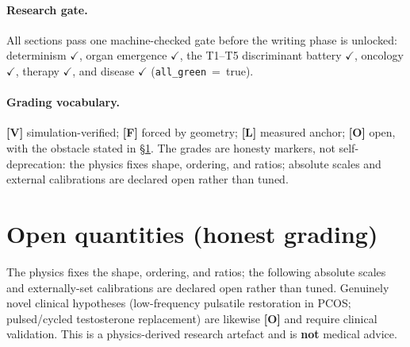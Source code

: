 \documentclass[11pt]{article}
\newcommand{\gradeV}{\textcolor{verified}{\textbf{[V]}}}
\newcommand{\gradeF}{\textcolor{forced}{\textbf{[F]}}}
\newcommand{\gradeL}{\textcolor{verified}{\textbf{[L]}}}
\newcommand{\gradeO}{\textcolor{open}{\textbf{[O]}}}
\begin{document}
\paragraph{Research gate.} All sections pass one machine-checked gate before the writing phase is unlocked:
determinism $\checkmark$, organ
emergence $\checkmark$, the T1--T5 discriminant battery
$\checkmark$, oncology
$\checkmark$, therapy
$\checkmark$, and disease
$\checkmark$ (\texttt{all\_green}~=~true).

\paragraph{Grading vocabulary.} \gradeV{} simulation-verified; \gradeF{} forced by geometry; \gradeL{}
measured anchor; \gradeO{} open, with the obstacle stated in \S\ref{sec:open}. The grades are honesty
markers, not self-deprecation: the physics fixes shape, ordering, and ratios; absolute scales and external
calibrations are declared open rather than tuned.

\section{Open quantities (honest grading)}\label{sec:open}

The physics fixes the shape, ordering, and ratios; the following absolute scales and externally-set
calibrations are declared open rather than tuned. Genuinely novel clinical hypotheses (low-frequency pulsatile
restoration in PCOS; pulsed/cycled testosterone replacement) are likewise \gradeO{} and require clinical
validation. This is a physics-derived research artefact and is \textbf{not} medical advice.
\end{document}
